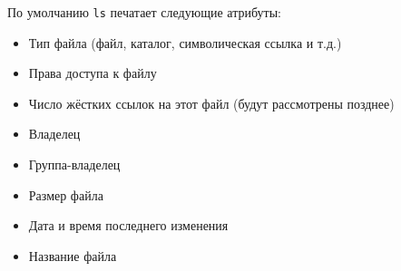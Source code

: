 \documentclass{beamer}
\begin{document}
\begin{frame}[fragile]
	По умолчанию \texttt{ls} печатает следующие атрибуты:\pause
	\begin{itemize}
		\item{Тип файла (файл, каталог, символическая ссылка и т.д.)}\pause
		\item{Права доступа к файлу}\pause
		\item{Число жёстких ссылок на этот файл (будут рассмотрены позднее)}\pause
		\item{Владелец}\pause
		\item{Группа-владелец}\pause
		\item{Размер файла}\pause
		\item{Дата и время последнего изменения}\pause
		\item{Название файла}\pause[0]
	\end{itemize}
	

\end{frame}
\end{document}
